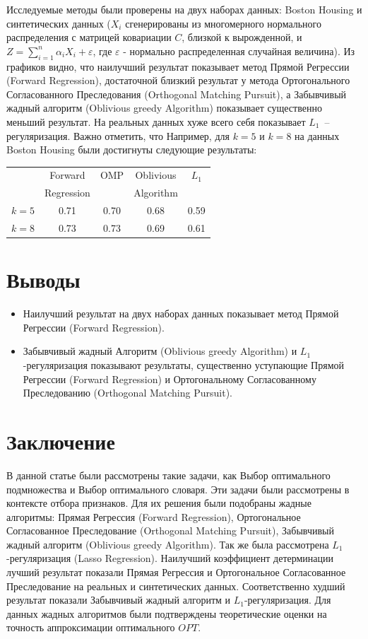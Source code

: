 \documentclass[preprint,12pt]{elsarticle}
\begin{document}
Исследуемые методы были проверены на двух наборах данных: Boston Housing и синтетических данных ($X_i$ сгенерированы из многомерного нормального распределения с матрицей ковариации $C$, близкой к вырожденной, и $Z = \sum\limits_{i = 1}^n \alpha_i X_i + \varepsilon$, где $\varepsilon$ - нормально распределенная случайная величина). Из графиков видно, что наилучший результат показывает метод Прямой Регрессии (Forward Regression), достаточной близкий результат у метода Ортогонального Согласованного Преследования (Orthogonal Matching Pursuit), а Забывчивый жадный алгоритм (Oblivious greedy Algorithm) показывает существенно меньший результат. На реальных данных хуже всего себя показывает $L_1$~-- регуляризация. Важно отметить, что Например, для $k = 5$ и $k = 8$ на данных Boston Housing были достигнуты следующие результаты: 
\begin{center}
    \begin{tabular}{ |c|c|c|c|c| } 
        \hline
          & Forward  & OMP & Oblivious& $L_1$ \\ 
          &  Regression & & Algorithm & \\ 
         \hline
         $k = 5$ & 0.71 & 0.70 & 0.68 & 0.59\\ 
         \hline
         $k = 8$ & 0.73 & 0.73 & 0.69& 0.61\\ 
         \hline
    \end{tabular}
\end{center}


\section{Выводы}
\begin{itemize}
    \item Наилучший результат на двух наборах данных показывает метод Прямой Регрессии (Forward Regression).
    \item Забывчивый жадный Алгоритм (Oblivious greedy Algorithm) и $L_1$-регуляризация показывают результаты, существенно уступающие Прямой Регрессии (Forward Regression) и  Ортогональному Согласованному Преследованию (Orthogonal Matching Pursuit).
\end{itemize}

\section{Заключение}

В данной статье были рассмотрены такие задачи, как Выбор оптимального подмножества и Выбор оптимального словаря. Эти задачи были рассмотрены в контексте отбора признаков. Для их решения были подобраны жадные алгоритмы: Прямая Регрессия (Forward Regression), Ортогональное Согласованное Преследование (Orthogonal Matching Pursuit), Забывчивый жадный алгоритм (Oblivious greedy Algorithm). Так же была рассмотрена $L_1$-регуляризация (Lasso Regression). Наилучший коэффициент детерминации лучший результат показали Прямая Регрессия и Ортогональное Согласованное Преследование на реальных и синтетических данных. Соответственно худший результат показали Забывчивый жадный алгоритм и $L_1$-регуляризация. Для данных жадных алгоритмов были подтверждены теоретические оценки на точность аппроксимации оптимального $OPT$. 
\end{document}
